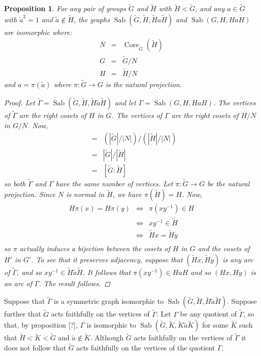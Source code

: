 \documentclass[12pt]{amsart}
\theoremstyle{plain}
\newtheorem{proposition}{Proposition}
\theoremstyle{definition}
\theoremstyle{remark}
\DeclareMathOperator{\core}{Core}
\DeclareMathOperator{\sab}{Sab}
\newcommand{\wt}[1]{\widetilde{#1}}
\begin{document}
\begin{proposition}
For any pair of groups $\wt{G}$ and $\wt{H}$ with $\wt{H} < \wt{G}$,
and any $a \in \wt{G}$ with $\wt{a}^2 = 1$ and $\wt{a} \not\in \wt{H}$,
the graphs
$\sab(\wt{G},\wt{H},\wt{H}a\wt{H})$ and $\sab(G, H, HaH)$
are isomorphic where: 
\begin{eqnarray*}
N  & = &\core_{\wt{G}}(\wt{H}) \\ 
G & = & \wt{G}/N \\
H & = & \wt{H}/N
\end{eqnarray*}
and $a = \pi(\wt{a})$ where $\pi : \wt{G} \to G$ is the natural projection.
\begin{proof}
Let $\wt{\Gamma} = \sab(\wt{G},\wt{H},\wt{H}\wt{a}\wt{H})$ 
and let $\Gamma = \sab(G,H,HaH)$.
The vertices of $\wt{\Gamma}$ are the right cosets of $H$ in $G$.
The vertices of $\Gamma$ are the right cosets of $H/N$ in $G/N$.
Now,
\begin{eqnarray*}
[\wt{G}/N : \wt{H}/N] & = & (|\wt{G}|/|N|)/(|\wt{H}|/|N|) \\
            & = & |\wt{G}|/|\wt{H}| \\
	    & = & [\wt{G}:\wt{H}]
\end{eqnarray*}
so both $\wt{\Gamma}$ and $\Gamma$ have the same number of vertices.
Let $\pi : \wt{G} \to G$ be the natural projection.
Since $N$ is normal in $\wt{H}$, we have $\pi(\wt{H}) = H$.
Now,
\begin{eqnarray*}
H\pi(x) = H\pi(y) & \Leftrightarrow & \pi(xy^{-1}) \in H \\
                    & \Leftrightarrow & xy^{-1} \in \wt{H} \\
		    & \Leftrightarrow & \wt{H}x = \wt{H}y \\
\end{eqnarray*}
so $\pi$ actually induces a bijection between the cosets of $H$
in $G$ and the cosets of $H'$ in $G'$.
To see that it preserves adjacency,
suppose that $(\wt{H}x,\wt{H}y)$ is any arc of $\wt{\Gamma}$,
and so $xy^{-1} \in \wt{H}\wt{a}\wt{H}$.
It follows that $\pi(xy^{-1}) \in HaH$
and so $(Hx,Hy)$ is an arc of $\Gamma$.
The result follows.
\end{proof}
\end{proposition}

Suppose that $\wt{\Gamma}$ is a symmetric graph 
isomorphic to $\sab(\wt{G},\wt{H},\wt{H}\wt{a}\wt{H})$.
Suppose further that $\wt{G}$ acts faithfully on the vertices of $\wt{\Gamma}$.
Let $\Gamma$ be any quotient of $\wt{\Gamma}$,
so that, by proposition [?], $\Gamma$ is isomorphic to 
$\sab(\wt{G},\wt{K},\wt{K}\wt{a}\wt{K})$ for some $\wt{K}$
such that $\wt{H} < \wt{K} < \wt{G}$ and $\wt{a} \not\in \wt{K}$.
Although $\wt{G}$ acts faithfully on the vertices of $\wt{\Gamma}$
it does not follow that $\wt{G}$ acts faithfully 
on the vertices of the quotient $\Gamma$.
\end{document}
